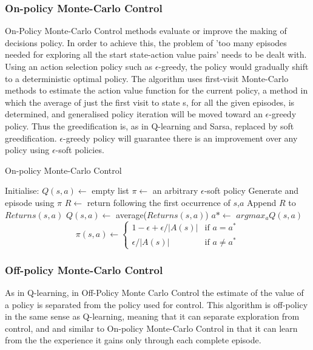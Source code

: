\documentclass[11pt]{article}
\begin{document}
\subsubsection{On-policy Monte-Carlo Control}
On-Policy Monte-Carlo Control methods evaluate or improve the making of decisions policy. In order to achieve this, the problem of 'too many episodes needed for exploring all the start state-action value pairs' needs to be dealt with. Using an action selection policy such as $\epsilon$-greedy, the policy would gradually shift to a deterministic optimal policy. The algorithm uses first-visit Monte-Carlo methods to estimate the action value function for the current policy, a method in which the average of just the first visit to state s, for all the given episodes, is determined, and generalised policy iteration will be moved toward an $\epsilon$-greedy policy. Thus the greedification is, as in Q-learning and Sarsa, replaced by soft greedification. $\epsilon$-greedy policy will guarantee there is an improvement over any policy using $\epsilon$-soft policies.

\begin{algorithm}
\caption{On-policy Monte-Carlo Control}
\begin{algorithmic}[1]
\label{onpmc}
\STATE Initialise:
\STATE $Q(s,a) \leftarrow$ empty list
\STATE $\pi \leftarrow$ an arbitrary $\epsilon$-soft policy
\LOOP
\STATE Generate and episode using $\pi$ 
\STATE $R \leftarrow$ return following the first occurrence of $s$,$a$
\STATE Append $R$ to $Returns(s,a)$
\STATE $Q(s,a) \leftarrow$ average($Returns(s,a)$)
\ENDFOR
{}
\STATE $a* \leftarrow$ $arg max_aQ(s,a)$
\STATE 
\begin{equation}
  \pi(s,a) \leftarrow 
  \begin{cases}
    1 - \epsilon + \epsilon/ \left|A(s)\right| & \text{if $a=a^*$}\\  
    \epsilon/ \left|A(s)\right| & \text{if $a \neq a^*$}
  \end{cases}
\end{equation}
\ENDFOR
\ENDFOR
\ENDLOOP
\ENDFOR
\end{algorithmic}
\end{algorithm}

\subsubsection{Off-policy Monte-Carlo Control}
As in Q-learning, in Off-Policy Monte Carlo Control the estimate of the value of a policy is separated from the policy used for control. This algorithm is off-policy in the same sense as Q-learning, meaning that it can separate exploration from control, and and similar to On-policy Monte-Carlo Control in that it can learn from the the experience it gains only through each complete episode.
\end{document}
